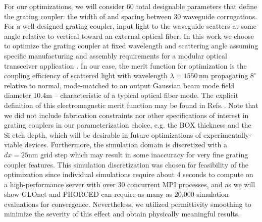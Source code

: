 \documentclass{article}
\begin{document}
For our optimizations, we will consider 60 total designable parameters that define the grating coupler: the width of and spacing between 30 waveguide corrugations. For a well-designed grating coupler, input light to the waveguide scatters at some angle relative to vertical toward an external optical fiber. In this work we choose to optimize the grating coupler at fixed wavelength and scattering angle assuming specific manufacturing and assembly requirements for a modular optical transceiver application \cite{mathai_detachable_2020, hooten_adjoint_2020}. In our case, the merit function for optimization is the coupling efficiency of scattered light with wavelength $\lambda=1550\,\text{nm}$ propagating $8^\circ$ relative to normal, mode-matched to an output Gaussian beam mode field diameter 10.4\textmu m -- characteristic of a typical optical fiber mode. The explicit definition of this electromagnetic merit function may be found in Refs.\,\cite{michaels_inverse_2018,hooten_adjoint_2020,watanabe_perpendicular_2017}. Note that we did not include fabrication constraints nor other specifications of interest in grating couplers in our parameterization choice, e.g. the BOX thickness and the Si etch depth, which will be desirable in future optimizations of experimentally-viable devices. Furthermore, the simulation domain is discretized with a $dx=25\text{nm}$ grid step which may result in some inaccuracy for very fine grating coupler features. This simulation discretization was chosen for feasibility of the optimization since individual simulations require about 4 seconds to compute on a high-performance server with over 30 concurrent MPI processes, and as we will show GLOnet and PHORCED can require as many as 20,000 simulation evaluations for convergence. Nevertheless, we utilized permittivity smoothing \cite{michaels_leveraging_2018} to minimize the severity of this effect and obtain physically meaningful results. 
\end{document}
